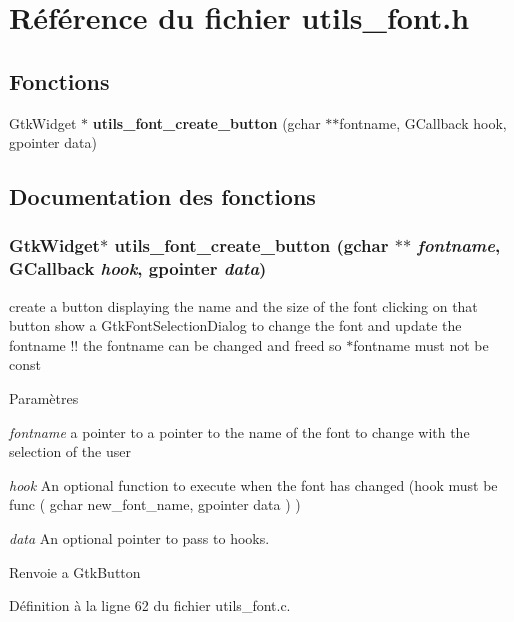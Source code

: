 \section{Référence du fichier utils\_\-font.h}
\label{utils__font_8h}
\subsection*{Fonctions}
\begin{DoxyCompactItemize}
\item 
GtkWidget $\ast$ {\bf utils\_\-font\_\-create\_\-button} (gchar $\ast$$\ast$fontname, GCallback hook, gpointer data)
\end{DoxyCompactItemize}


\subsection{Documentation des fonctions}
\subsubsection[{utils\_\-font\_\-create\_\-button}]{\setlength{\rightskip}{0pt plus 5cm}GtkWidget$\ast$ utils\_\-font\_\-create\_\-button (gchar $\ast$$\ast$ {\em fontname}, \/  GCallback {\em hook}, \/  gpointer {\em data})}\label{utils__font_8h_acb32a0d74b002d3e38a74fff48c7c3e5}
create a button displaying the name and the size of the font clicking on that button show a GtkFontSelectionDialog to change the font and update the fontname !! the fontname can be changed and freed so $\ast$fontname must not be const


\begin{DoxyParams}{Paramètres}
\item[{\em fontname}]a pointer to a pointer to the name of the font to change with the selection of the user \item[{\em hook}]An optional function to execute when the font has changed (hook must be func ( gchar new\_\-font\_\-name, gpointer data ) ) \item[{\em data}]An optional pointer to pass to hooks.\end{DoxyParams}
\begin{DoxyReturn}{Renvoie}
a GtkButton 
\end{DoxyReturn}


Définition à la ligne 62 du fichier utils\_\-font.c.

